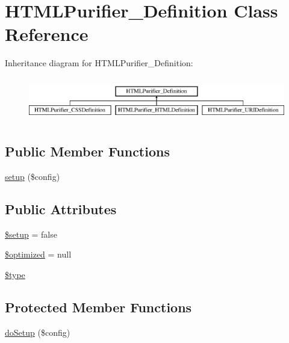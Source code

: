 \hypertarget{classHTMLPurifier__Definition}{\section{H\+T\+M\+L\+Purifier\+\_\+\+Definition Class Reference}
\label{classHTMLPurifier__Definition}
}
Inheritance diagram for H\+T\+M\+L\+Purifier\+\_\+\+Definition\+:\begin{figure}[H]
\begin{center}
\leavevmode
\includegraphics[height=1.964912cm]{classHTMLPurifier__Definition}
\end{center}
\end{figure}
\subsection*{Public Member Functions}
\begin{DoxyCompactItemize}
\item 
\hyperlink{classHTMLPurifier__Definition_aa3b7b8592a5aa6341d4b6d32aef21fd1}{setup} (\$config)
\end{DoxyCompactItemize}
\subsection*{Public Attributes}
\begin{DoxyCompactItemize}
\item 
\hyperlink{classHTMLPurifier__Definition_a8770f38b390d596bb5611c517e0710b3}{\$setup} = false
\item 
\hyperlink{classHTMLPurifier__Definition_a3250fd885bfeeee52b9c92f093628dc0}{\$optimized} = null
\item 
\hyperlink{classHTMLPurifier__Definition_a2e14e97d237d70cb1b22379e99e7100e}{\$type}
\end{DoxyCompactItemize}
\subsection*{Protected Member Functions}
\begin{DoxyCompactItemize}
\item 
\hyperlink{classHTMLPurifier__Definition_abe6d0aa7dbc557e0074fc635ed915344}{do\+Setup} (\$config)
\end{DoxyCompactItemize}


